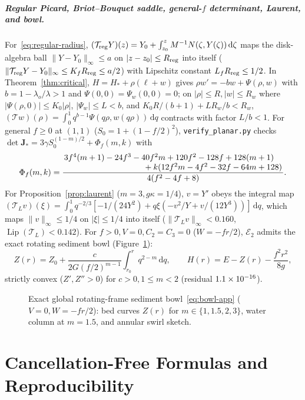 \documentclass[12pt,a4paper,oneside]{report}
\numberwithin{equation}{chapter}
\theoremstyle{definition}
\theoremstyle{remark}\newtheorem{remark}[theorem]{Remark}
\newcommand{\dd}{\,\mathrm d}
\DeclareRobustCommand{\code}[1]{\nolinkurl{#1}}
\begin{document}
\paragraph{Regular Picard, Briot--Bouquet saddle, general-$f$ determinant, Laurent, and bowl.}
For~\eqref{eq:regular-radius}, $(\mathcal T_{\rm reg}Y)(z)=Y_0+\int_{z_0}^z M^{-1}N(\zeta,Y(\zeta))\dd\zeta$ maps the disk-algebra ball $\|Y-Y_0\|_\infty\le a$ on $|z-z_0|\le R_{\rm reg}$ into itself ($\|\mathcal T_{\rm reg}Y-Y_0\|_\infty\le K_f R_{\rm reg}\le a/2$) with Lipschitz constant $L_f R_{\rm reg}\le1/2$. In Theorem~\ref{thm:critical}, $H=H_*+\rho(\ell+w)$ gives $\rho w'=-bw+\Psi(\rho,w)$ with $b=1-\lambda_o/\lambda>1$ and $\Psi(0,0)=\Psi_w(0,0)=0$; on $|\rho|\le R,|w|\le R_w$ where $|\Psi(\rho,0)|\le K_0|\rho|$, $|\Psi_w|\le L<b$, and $K_0R/(b+1)+LR_w/b<R_w$, $(\mathcal Tw)(\rho)=\int_0^1 q^{b-1}\Psi(q\rho,w(q\rho))\dd q$ contracts with factor $L/b<1$. For general $f\ge0$ at $(1,1)$ ($S_0=1+(1-f/2)^2$), \code{verify_planar.py} checks $\det\mathbf J_*=3\gamma S_0^{(1-m)/2}+\Phi_f(m,k)$ with
\[
 \Phi_f(m,k)=\frac{\splitfrac{3f^4(m+1)-24f^3-40f^2m+120f^2-128f+128(m+1)}{+k(12f^2m-4f^2-32f-64m+128)}}{4(f^2-4f+8)}.
\]
For Proposition~\ref{prop:laurent} ($m=3,g\kappa=1/4$), $v=Y'$ obeys the integral map $(\mathcal T_Lv)(\xi)=\int_0^1 q^{-2/3}[-1/(24Y^2)+q\xi(-v^2/Y+v/(12Y^3))]\dd q$, which maps $\|v\|_\infty\le1/4$ on $|\xi|\le1/4$ into itself ($\|\mathcal T_Lv\|_\infty<0.160$, $\operatorname{Lip}(\mathcal T_L)<0.142$). For $f>0,V=0,C_2=C_3=0$ ($W=-fr/2$), $\mathcal E_2$ admits the exact rotating sediment bowl (Figure~\ref{fig:bowl}):
\begin{equation}\label{eq:bowl-app}
 Z(r)=Z_0+\frac{c}{2G(f/2)^{m-1}}\int_{r_0}^r q^{2-m}\dd q,\qquad H(r)=E-Z(r)-\frac{f^2r^2}{8g},
\end{equation}
strictly convex ($Z',Z''>0$) for $c>0,1\le m<2$ (residual $1.1\times 10^{-16}$).

\begin{figure}[!ht]\centering

\caption[Exact rotating convex-bed sediment bowl]{Exact global rotating-frame sediment bowl~\eqref{eq:bowl-app} ($V=0,W=-fr/2$): bed curves $Z(r)$ for $m\in\{1,1.5,2,3\}$, water column at $m=1.5$, and annular swirl sketch.}
\label{fig:bowl}
\end{figure}
\FloatBarrier

\chapter{Cancellation-Free Formulas and Reproducibility}\label{app:reproducibility}
\end{document}
